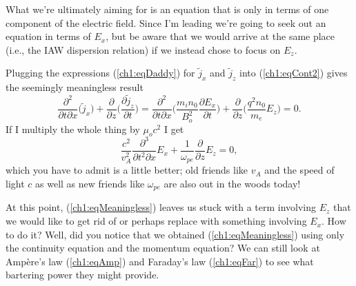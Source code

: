 What we're ultimately aiming for is an equation that is only in terms
of one component of the electric field. Since I'm leading we're going to seek
out an equation in terms of $E_x$, but be aware that we would arrive at the same
place (i.e., the IAW dispersion relation) if we instead chose to focus on $E_z$.

Plugging the expressions (\ref{ch1:eqDaddy}) for $\tilde j_x$ and $\tilde j_z$
into (\ref{ch1:eqCont2}) gives the seemingly meaningless result
\begin{equation*}
    \dfrac{\partial^2}{\partial t \partial x} \Big( \tilde j_x \Big) + \dfrac{\partial}{\partial z}
    \Big( \dfrac{\partial \tilde j_z}{\partial t} \Big) = \dfrac{\partial^2}{\partial
      t \partial x} \Big(\dfrac{m_i n_0 }{B_o^2}\dfrac{\partial E_x}{\partial t} \Big) +
    \dfrac{\partial}{\partial z} \Big( \dfrac{q^2 n_0}{m_e} E_z \Big) = 0.
\end{equation*}
If I multiply the whole thing by $\mu_o c^2$ I get 
\begin{equation} \label{ch1:eqMeaningless}
  \dfrac{c^2}{v_A^2}\dfrac{\partial^3 }{\partial t^2 \partial x} E_x + \dfrac{1}{\omega_{pe}}\dfrac{\partial}{\partial z} E_z = 0,
\end{equation}
which you have to admit is a little better; old friends like $v_A$ and the speed
of light $c$ as well as new friends like $\omega_{pe}$ are also out in the woods
today!

At this point, (\ref{ch1:eqMeaningless}) leaves us stuck with a term involving
$E_z$ that we would like to get rid of or perhaps replace with something
involving $E_x$. How to do it? Well, did you notice that we obtained
(\ref{ch1:eqMeaningless}) using only the continuity equation and the momentum
equation? We can still look at Amp\`{e}re's law (\ref{ch1:eqAmp}) and Faraday's
law (\ref{ch1:eqFar}) to see what bartering power they might provide.

